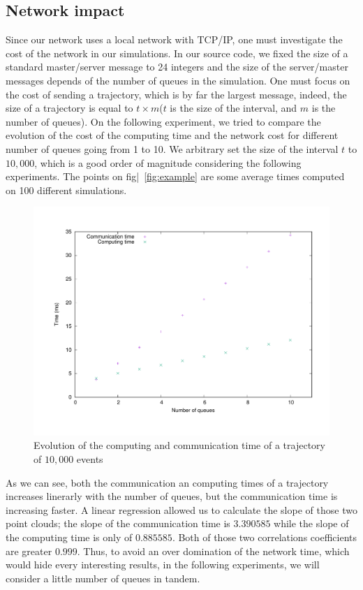 \documentclass[a4paper,10pt]{article}
\begin{document}
\subsection{Network impact}
\label{sec:networkimpact}
Since our network uses a local network with TCP/IP, one must investigate the cost of the network in our simulations. 
In our source code, we fixed the size of a standard master/server message to 24 integers and the size of the server/master messages depends of the number of queues in the simulation. One must focus on the cost of sending a trajectory, which is by far the largest message, indeed, the size of a trajectory is equal to $t \times m$($t$ is the size of the interval, and $m$ is the number of queues). On the following experiment, we tried to compare the evolution of the cost of the computing time and the network cost for different number of queues going from 1 to 10. We arbitrary set the size of the interval $t$ to $10,000$, which is a good order of magnitude considering the following experiments. The points on fig|~\ref{fig:example} are some average times computed on 100 different simulations.

\begin{figure}[h]
\centering
 \includegraphics[scale=0.45]{time_traj.pdf}
 \caption{Evolution of the computing and communication time of a trajectory of $10,000$ events}
\end{figure}

As we can see, both the communication an computing times of a trajectory increases linerarly with the number of queues, but the communication time is increasing faster. A linear regression allowed us to calculate the slope of those two point clouds; the slope of the communication time is $3.390585$ while the slope of the computing time is only of $0.885585$. Both of those two correlations coefficients are greater $0.999$. Thus, to avoid an over domination of the network time, which would hide every interesting results, in the following experiments, we will consider a little number of queues in tandem.
\end{document}
